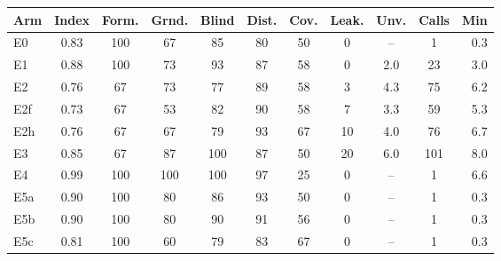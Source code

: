 \begin{tabular}{@{}lcccccccccr@{}}
\toprule
Arm & Index & Form. & Grnd. & Blind & Dist. & Cov. & Leak. & Unv. & Calls & Min \\
\midrule
E0 & 0.83 & 100 & 67 & 85 & 80 & 50 & 0 & -- & 1 & 0.3 \\
E1 & 0.88 & 100 & 73 & 93 & 87 & 58 & 0 & 2.0 & 23 & 3.0 \\
E2 & 0.76 & 67 & 73 & 77 & 89 & 58 & 3 & 4.3 & 75 & 6.2 \\
E2f & 0.73 & 67 & 53 & 82 & 90 & 58 & 7 & 3.3 & 59 & 5.3 \\
E2h & 0.76 & 67 & 67 & 79 & 93 & 67 & 10 & 4.0 & 76 & 6.7 \\
E3 & 0.85 & 67 & 87 & 100 & 87 & 50 & 20 & 6.0 & 101 & 8.0 \\
E4 & 0.99 & 100 & 100 & 100 & 97 & 25 & 0 & -- & 1 & 6.6 \\
E5a & 0.90 & 100 & 80 & 86 & 93 & 50 & 0 & -- & 1 & 0.3 \\
E5b & 0.90 & 100 & 80 & 90 & 91 & 56 & 0 & -- & 1 & 0.3 \\
E5c & 0.81 & 100 & 60 & 79 & 83 & 67 & 0 & -- & 1 & 0.3 \\
\bottomrule
\end{tabular}
